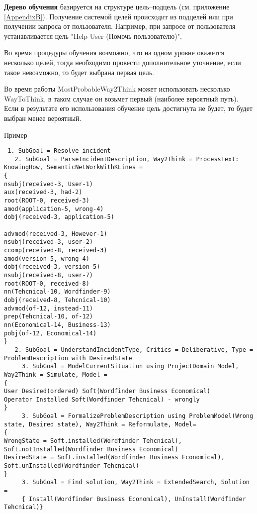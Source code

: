 \textbf{Дерево обучения} базируется на структуре цель--подцель (см. приложение \ref{AppendixB}). Получение системой целей происходит из подцелей или при получении запроса от пользователя. Например, при запросе от пользователя устанавливается цель "Help User (Помочь пользователю)".\par

Во время процедуры обучения возможно, что на одном уровне окажется несколько целей, тогда необходимо провести дополнительное уточнение, если такое невозможно, то будет выбрана первая цель.


Во время работы MostProbableWay2Think может использовать несколько WayToThink, в таком случае он возьмет первый (наиболее вероятный путь). Если в результате его использования обучение цель достигнута не будет, то будет выбран менее вероятный.

Пример
\begin{lstlisting}
 1. SubGoal = Resolve incident
   2. SubGoal = ParseIncidentDescription, Way2Think = ProcessText: KnowingHow, SemanticNetWorkWithKLines =
{
nsubj(received-3, User-1)
aux(received-3, had-2)
root(ROOT-0, received-3)
amod(application-5, wrong-4)
dobj(received-3, application-5)

advmod(received-3, However-1)
nsubj(received-3, user-2)
ccomp(received-8, received-3)
amod(version-5, wrong-4)
dobj(received-3, version-5)
nsubj(received-8, user-7)
root(ROOT-0, received-8)
nn(Tehcnical-10, Wordfinder-9)
dobj(received-8, Tehcnical-10)
advmod(of-12, instead-11)
prep(Tehcnical-10, of-12)
nn(Economical-14, Business-13)
pobj(of-12, Economical-14)
}
   2. SubGoal = UnderstandIncidentType, Critics = Deliberative, Type = ProblemDescription with DesiredState
     3. SubGoal = ModelCurrentSituation using ProjectDomain Model, Way2Think = Simulate, Model =
{
User Desired(ordered) Soft(Wordfinder Business Economical)
Operator Installed Soft(Wordfinder Tehcnical) - wrongly
}
     3. SubGoal = FormalizeProblemDescription using ProblemModel(Wrong state, Desired state), Way2Think = Reformulate, Model=
{
WrongState = Soft.installed(Wordfinder Tehcnical), Soft.notInstalled(Wordfinder Business Economical)
DesiredState = Soft.installed(Wordfinder Business Economical), Soft.unInstalled(Wordfinder Tehcnical)
}
     3. SubGoal = Find solution, Way2Think = ExtendedSearch, Solution =
     { Install(Wordfinder Business Economical), UnInstall(Wordfinder Tehcnical)}
     
\end{lstlisting}
\clearpage

